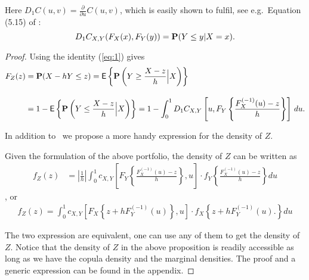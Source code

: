 Here $D_1 C(u,v)=\displaystyle \frac{\partial}{\partial u} C(u,v)$,
which is easily shown to fulfil, see e.g.\ Equation (5.15) of
\citep{McNeil2005}:
\begin{equation}
  \label{eq:1}
  D_1 C_{X,Y}(F_X(x), F_Y(y)) = {\bf P}(Y\leq y|X=x).
\end{equation}
\begin{proof}
  Using the identity (\ref{eq:1}) gives
  \begin{align*}
    F_{Z}(z) &= \p(X - h Y\leq z) %
                 = \mbox{\sf E}\left\{\p\left(Y\geq \frac{X-z}{h}\Big|
                 X\right)\right\}\\[10pt]
               &= 1-\mbox{\sf E}\left\{\p\left(Y\leq \frac{X-z}{h}\Big|
                 X\right)\right\}%
               = 1- \int_0^1 D_1 C_{X, Y}\left[u,
                 F_{Y}\left\{\frac{F^{(-1)}_{X}(u) -
                 z}{h}\right\}\right]\, d u.
  \end{align*}

In addition to~\cite{barbi2014copula} we propose a more handy
expression for the density of $Z$. 

\begin{prop} Given the formulation of the above portfolio, the density of $Z$ can be written as
  \begin{align}
  f_{Z}(z) &= \left|\frac{1}{h}\right|\int_0^1 c_{X, Y} \left[
  F_{Y}\left\{\frac{F^{(-1)}_{X}(u)-z}{h}\right\}, u
  \right]
   \cdot
  f_{Y}
  \left\{\frac{F^{(-1)}_{X}(u)-z}{h}\right\} du \label{eq:density1}
  \end{align}, or
    \begin{align}
      f_{Z}(z)
      = \int_0^1 c_{X, Y} \left[
      F_{X}\left\{z + h F^{(-1)}_{Y}(u)\right\}, u
      \right]
       \cdot
      f_{X}
      \left\{
      z+ hF^{(-1)}_{Y}(u).
      \right\} du\label{eq:density2}
  \end{align}
  \end{prop}
The two expression are equivalent, one can use any of them to get the
density of $Z$. 
Notice that the density of $Z$ in the above proposition is readily accessible as long as we have
the copula density and the marginal densities.
The proof and a generic expression can be found in the
appendix. \medskip


\end{proof}
